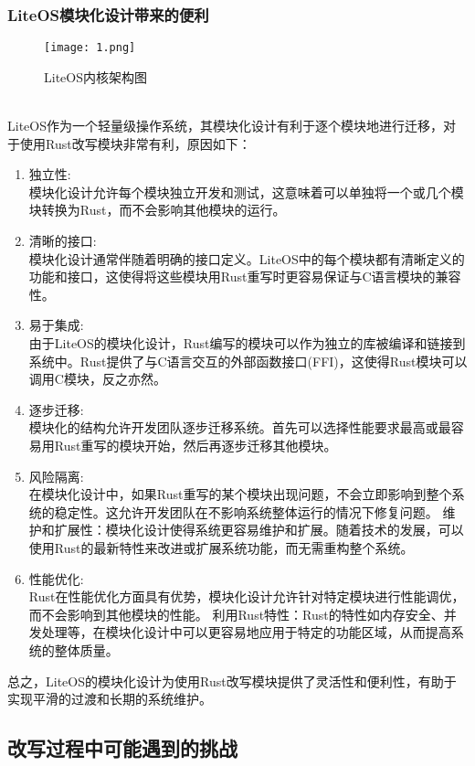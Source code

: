 \documentclass{ctexart}
\begin{document}
\subsubsection{LiteOS模块化设计带来的便利}
\begin{figure}[h]
\centering
\texttt{[image: 1.png]}
\caption{LiteOS内核架构图}
\end{figure}\ \\
\indent LiteOS作为一个轻量级操作系统，其模块化设计有利于逐个模块地进行迁移，对于使用Rust改写模块非常有利，原因如下：
\begin{enumerate}
\item 独立性:\\
模块化设计允许每个模块独立开发和测试，这意味着可以单独将一个或几个模块转换为Rust，而不会影响其他模块的运行。
\item 清晰的接口:\\
模块化设计通常伴随着明确的接口定义。LiteOS中的每个模块都有清晰定义的功能和接口，这使得将这些模块用Rust重写时更容易保证与C语言模块的兼容性。
\item 易于集成:\\
由于LiteOS的模块化设计，Rust编写的模块可以作为独立的库被编译和链接到系统中。Rust提供了与C语言交互的外部函数接口(FFI)，这使得Rust模块可以调用C模块，反之亦然。
\item 逐步迁移:\\
模块化的结构允许开发团队逐步迁移系统。首先可以选择性能要求最高或最容易用Rust重写的模块开始，然后再逐步迁移其他模块。
\item 风险隔离:\\
在模块化设计中，如果Rust重写的某个模块出现问题，不会立即影响到整个系统的稳定性。这允许开发团队在不影响系统整体运行的情况下修复问题。
维护和扩展性：模块化设计使得系统更容易维护和扩展。随着技术的发展，可以使用Rust的最新特性来改进或扩展系统功能，而无需重构整个系统。
\item 性能优化:\\
Rust在性能优化方面具有优势，模块化设计允许针对特定模块进行性能调优，而不会影响到其他模块的性能。
利用Rust特性：Rust的特性如内存安全、并发处理等，在模块化设计中可以更容易地应用于特定的功能区域，从而提高系统的整体质量。
\end{enumerate}
总之，LiteOS的模块化设计为使用Rust改写模块提供了灵活性和便利性，有助于实现平滑的过渡和长期的系统维护。
\subsection{改写过程中可能遇到的挑战}\ \\
\end{document}
